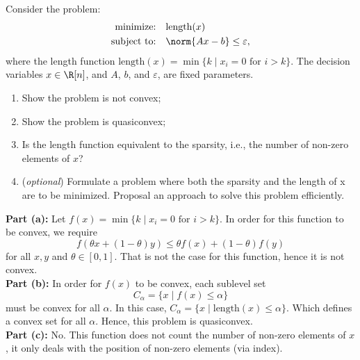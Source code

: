 \documentclass[11pt]{article}
\begin{document}
\begin{homeworkProblem}

    Consider the problem:
    \begin{align*}
        \text{minimize:} \quad   & \text{length}(x)                \\
        \text{subject to:} \quad & \norm{Ax - b} \leq \varepsilon,
    \end{align*}
    where the length function $\text{length}(x) = \min\{ k \mid x_i = 0 \text{ for } i > k \} $. The decision variables $x \in \R[n]$, and
    $A$, $b$, and $\varepsilon$, are fixed parameters.
    \begin{enumerate}[label=(\alph*), topsep=5pt, itemsep=5pt]
        \item Show the problem is not convex;
        \item Show the problem is quasiconvex;
        \item Is the length function equivalent to the sparsity, i.e., the number of non-zero elements of $x$?
        \item (\textit{optional}) Formulate a problem where both the sparsity and the length of x are to be
              minimized. Proposal an approach to solve this problem efficiently. \newline
    \end{enumerate}
    \solution

    \textbf{Part (a):} Let $f(x) = \min\{ k \mid x_i = 0 \text{ for } i > k \} $. In order for this function to be convex, we require
    \[
        f(\theta x + (1 - \theta) y) \leq \theta f(x) + (1 - \theta) f(y)
    \]
    for all $x, y$ and $\theta \in [0, 1]$. That is not the case for this function, hence it is not convex. \\

    \textbf{Part (b):} In order for $f(x)$ to be convex, each sublevel set
    \[
        C_\alpha = \{ x \mid f(x) \leq \alpha \}
    \]
    must be convex for all $\alpha$. In this case, $C_\alpha = \{ x \mid \text{length}(x) \leq \alpha \}$. Which defines a convex set for all $\alpha$. Hence, this problem is quasiconvex. \\

    \textbf{Part (c):} No. This function does not count the number of non-zero elements of $x$, it only deals with the position of non-zero elements (via index).

\end{homeworkProblem}

\pagebreak
\end{document}
